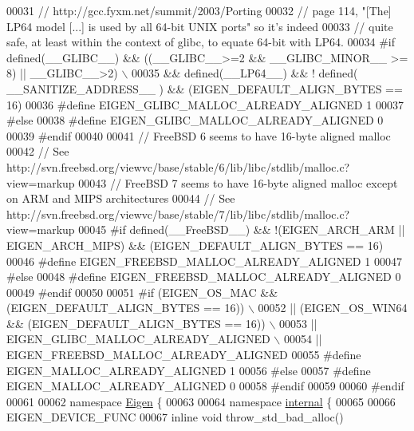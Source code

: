 \begin{DoxyCode}
00031 \textcolor{comment}{//   http://gcc.fyxm.net/summit/2003/Porting%
00032 \textcolor{comment}{// page 114, "[The] LP64 model [...] is used by all 64-bit UNIX ports" so it's indeed}
00033 \textcolor{comment}{// quite safe, at least within the context of glibc, to equate 64-bit with LP64.}
00034 \textcolor{preprocessor}{#if defined(\_\_GLIBC\_\_) && ((\_\_GLIBC\_\_>=2 && \_\_GLIBC\_MINOR\_\_ >= 8) || \_\_GLIBC\_\_>2) \(\backslash\)}
00035 \textcolor{preprocessor}{ && defined(\_\_LP64\_\_) && ! defined( \_\_SANITIZE\_ADDRESS\_\_ ) && (EIGEN\_DEFAULT\_ALIGN\_BYTES == 16)}
00036 \textcolor{preprocessor}{  #define EIGEN\_GLIBC\_MALLOC\_ALREADY\_ALIGNED 1}
00037 \textcolor{preprocessor}{#else}
00038 \textcolor{preprocessor}{  #define EIGEN\_GLIBC\_MALLOC\_ALREADY\_ALIGNED 0}
00039 \textcolor{preprocessor}{#endif}
00040 
00041 \textcolor{comment}{// FreeBSD 6 seems to have 16-byte aligned malloc}
00042 \textcolor{comment}{//   See http://svn.freebsd.org/viewvc/base/stable/6/lib/libc/stdlib/malloc.c?view=markup}
00043 \textcolor{comment}{// FreeBSD 7 seems to have 16-byte aligned malloc except on ARM and MIPS architectures}
00044 \textcolor{comment}{//   See http://svn.freebsd.org/viewvc/base/stable/7/lib/libc/stdlib/malloc.c?view=markup}
00045 \textcolor{preprocessor}{#if defined(\_\_FreeBSD\_\_) && !(EIGEN\_ARCH\_ARM || EIGEN\_ARCH\_MIPS) && (EIGEN\_DEFAULT\_ALIGN\_BYTES == 16)}
00046 \textcolor{preprocessor}{  #define EIGEN\_FREEBSD\_MALLOC\_ALREADY\_ALIGNED 1}
00047 \textcolor{preprocessor}{#else}
00048 \textcolor{preprocessor}{  #define EIGEN\_FREEBSD\_MALLOC\_ALREADY\_ALIGNED 0}
00049 \textcolor{preprocessor}{#endif}
00050 
00051 \textcolor{preprocessor}{#if (EIGEN\_OS\_MAC && (EIGEN\_DEFAULT\_ALIGN\_BYTES == 16))     \(\backslash\)}
00052 \textcolor{preprocessor}{ || (EIGEN\_OS\_WIN64 && (EIGEN\_DEFAULT\_ALIGN\_BYTES == 16))   \(\backslash\)}
00053 \textcolor{preprocessor}{ || EIGEN\_GLIBC\_MALLOC\_ALREADY\_ALIGNED              \(\backslash\)}
00054 \textcolor{preprocessor}{ || EIGEN\_FREEBSD\_MALLOC\_ALREADY\_ALIGNED}
00055 \textcolor{preprocessor}{  #define EIGEN\_MALLOC\_ALREADY\_ALIGNED 1}
00056 \textcolor{preprocessor}{#else}
00057 \textcolor{preprocessor}{  #define EIGEN\_MALLOC\_ALREADY\_ALIGNED 0}
00058 \textcolor{preprocessor}{#endif}
00059 
00060 \textcolor{preprocessor}{#endif}
00061 
00062 \textcolor{keyword}{namespace }\hyperlink{namespace_eigen}{Eigen} \{
00063 
00064 \textcolor{keyword}{namespace }\hyperlink{namespaceinternal}{internal} \{
00065 
00066 EIGEN\_DEVICE\_FUNC 
00067 \textcolor{keyword}{inline} \textcolor{keywordtype}{void} throw\_std\_bad\_alloc()
}
\end{DoxyCode}
